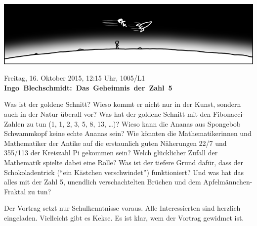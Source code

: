 \documentclass[a4paper,ngerman,landscape]{scrartcl}
\begin{document}
\begin{center}
  \Huge
  \vspace*{0.0em}
  \includegraphics[scale=1.00]{orbit-wide}
  \vspace{0.5em}

  \vspace{1em}

  Freitag, 16. Oktober 2015, 12:15 Uhr, 1005/L1 \\
  \mbox{\textbf{Ingo Blechschmidt: Das Geheimnis der Zahl 5}}

  \Large
  \begin{minipage}{0.80\textwidth}
    \setlength\parskip{\medskipamount}
    Was ist der goldene Schnitt? Wieso kommt er nicht nur in der Kunst, sondern
    auch in der Natur überall vor? Was hat der goldene Schnitt mit den
    Fibonacci-Zahlen zu tun (1, 1, 2, 3, 5, 8, 13, \ldots)? Wieso kann die Ananas
    aus Spongebob Schwammkopf keine echte Ananas sein? Wie könnten die
    Mathematikerinnen und Mathematiker der Antike auf die erstaunlich guten
    Näherungen 22/7 und 355/113 der Kreiszahl Pi gekommen sein? Welch
    glücklicher Zufall der Mathematik spielte dabei eine Rolle? Was ist der
    tiefere Grund dafür, dass der Schokoladentrick ("`ein Kästchen
    verschwindet"') funktioniert? Und was hat das alles mit der Zahl 5,
    unendlich verschachtelten Brüchen und dem Apfelmännchen-Fraktal zu tun?

    Der Vortrag setzt nur Schulkenntnisse voraus. Alle Interessierten sind
    herzlich eingeladen. Vielleicht gibt es Kekse. Es ist klar, wem der Vortrag
    gewidmet ist.
    \vspace{0.3em}
  \end{minipage}
\end{center}
\end{document}
